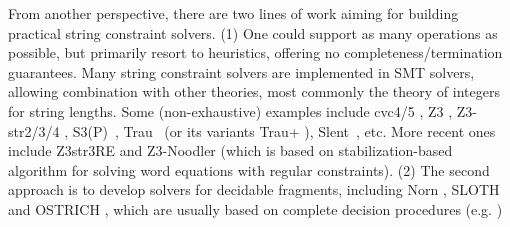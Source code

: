 From another perspective, there are two lines of work aiming for building practical string constraint solvers. %
(1) One could support as many operations as possible, but primarily resort to heuristics, offering no completeness/termination guarantees. 
Many string constraint solvers are implemented in SMT solvers, %
allowing combination with other theories, most commonly the theory of integers for string lengths. Some (non-exhaustive) examples include cvc4/5 \cite{cvc4,BarbosaBBKLMMMN22}, Z3 \cite{Z3,BTV09}, Z3-str2/3/4 \cite{Z3str2,Z3str3,Z3str4}, S3(P)~\cite{TCJ16,S3}, Trau~\cite{Abdulla17} (or its variants Trau+ \cite{AbdullaA+19}), %
Slent~\cite{WC+18}, etc.  
%
%
More recent ones include Z3str3RE \cite{BerzishKMMDNG20} %
% 
and Z3-Noodler \cite{ChenCHHLS24} %
(which is based on stabilization-based algorithm \cite{BlahoudekCCHHLS23,ChenCHHLS23} for solving word equations with regular constraints). 
%
%
(2) The second approach is to develop solvers for decidable fragments, 
including Norn \cite{Abdulla14}, SLOTH \cite{HJLRV18} and
OSTRICH \cite{CCH+18,CHL+19}, which are usually based on complete decision procedures (e.g. \cite{Vijay-length,AbdullaA+19,LB16}) 

